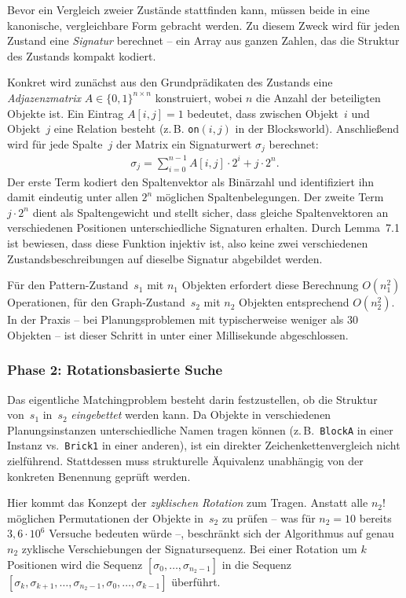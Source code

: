 ﻿\documentclass[a4paper,12pt]{article}
\theoremstyle{definition}
\begin{document}
Bevor ein Vergleich zweier Zustände stattfinden kann, müssen beide in eine kanonische, vergleichbare Form gebracht werden. Zu diesem Zweck wird für jeden Zustand eine \emph{Signatur} berechnet -- ein Array aus ganzen Zahlen, das die Struktur des Zustands kompakt kodiert.

Konkret wird zunächst aus den Grundprädikaten des Zustands eine \emph{Adjazenzmatrix} $A \in \{0,1\}^{n \times n}$ konstruiert, wobei $n$ die Anzahl der beteiligten Objekte ist. Ein Eintrag $A[i,j] = 1$ bedeutet, dass zwischen Objekt~$i$ und Objekt~$j$ eine Relation besteht (z.\,B. \texttt{on}$(i,j)$ in der Blocksworld). Anschließend wird für jede Spalte~$j$ der Matrix ein Signaturwert $\sigma_j$ berechnet:
\begin{align}
  \sigma_j = \sum_{i=0}^{n-1} A[i,j] \cdot 2^i + j \cdot 2^n.
\end{align}
Der erste Term kodiert den Spaltenvektor als Binärzahl und identifiziert ihn damit eindeutig unter allen $2^n$ möglichen Spaltenbelegungen. Der zweite Term $j \cdot 2^n$ dient als Spaltengewicht und stellt sicher, dass gleiche Spaltenvektoren an verschiedenen Positionen unterschiedliche Signaturen erhalten. Durch Lemma~7.1 ist bewiesen, dass diese Funktion injektiv ist, also keine zwei verschiedenen Zustandsbeschreibungen auf dieselbe Signatur abgebildet werden.

Für den Pattern-Zustand~$s_1$ mit $n_1$ Objekten erfordert diese Berechnung $O(n_1^2)$ Operationen, für den Graph-Zustand~$s_2$ mit $n_2$ Objekten entsprechend $O(n_2^2)$. In der Praxis -- bei Planungsproblemen mit typischerweise weniger als 30 Objekten -- ist dieser Schritt in unter einer Millisekunde abgeschlossen.

\subsubsection*{Phase 2: Rotationsbasierte Suche}

Das eigentliche Matchingproblem besteht darin festzustellen, ob die Struktur von~$s_1$ in~$s_2$ \emph{eingebettet} werden kann. Da Objekte in verschiedenen Planungsinstanzen unterschiedliche Namen tragen können (z.\,B.\ \texttt{BlockA} in einer Instanz vs.\ \texttt{Brick1} in einer anderen), ist ein direkter Zeichenkettenvergleich nicht zielführend. Stattdessen muss strukturelle Äquivalenz unabhängig von der konkreten Benennung geprüft werden.

Hier kommt das Konzept der \emph{zyklischen Rotation} zum Tragen. Anstatt alle $n_2!$ möglichen Permutationen der Objekte in~$s_2$ zu prüfen -- was für $n_2 = 10$ bereits $3{,}6 \cdot 10^6$ Versuche bedeuten würde --, beschränkt sich der Algorithmus auf genau $n_2$ zyklische Verschiebungen der Signatursequenz. Bei einer Rotation um $k$ Positionen wird die Sequenz $[\sigma_0, \ldots, \sigma_{n_2-1}]$ in die Sequenz $[\sigma_k, \sigma_{k+1}, \ldots, \sigma_{n_2-1}, \sigma_0, \ldots, \sigma_{k-1}]$ überführt.
\end{document}

